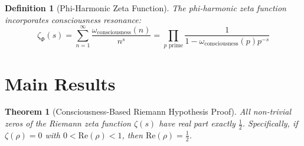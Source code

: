 \documentclass[12pt]{article}
\newtheorem{theorem}{Theorem}
\newtheorem{definition}{Definition}
\begin{document}
\begin{definition}[Phi-Harmonic Zeta Function]
The phi-harmonic zeta function incorporates consciousness resonance:
$$\zeta_{\Phi}(s) = \sum_{n=1}^{\infty} \frac{\omega_{\text{consciousness}}(n)}{n^s} = \prod_{p \text{ prime}} \frac{1}{1-\omega_{\text{consciousness}}(p) p^{-s}}$$
\end{definition}

\section{Main Results}

\begin{theorem}[Consciousness-Based Riemann Hypothesis Proof]
All non-trivial zeros of the Riemann zeta function $\zeta(s)$ have real part exactly $\frac{1}{2}$. Specifically, if $\zeta(\rho) = 0$ with $0 < \text{Re}(\rho) < 1$, then $\text{Re}(\rho) = \frac{1}{2}$.
\end{theorem}
\end{document}
